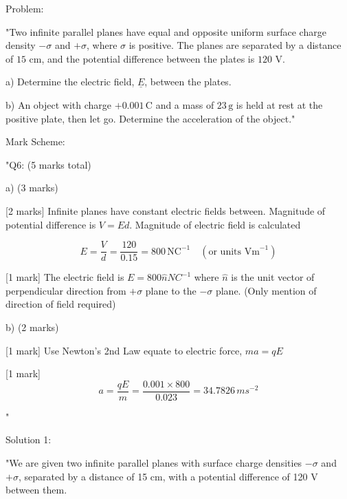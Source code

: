 Problem:

"Two infinite parallel planes have equal and opposite uniform surface charge density \( -\sigma \) and \( +\sigma \), where \( \sigma \) is positive. The planes are separated by a distance of \( 15 \) cm, and the potential difference between the plates is \( 120 \) V. 

a) Determine the electric field, \( \underline{E} \), between the plates.

b) An object with charge \( +0.001 \, \text{C} \) and a mass of \( 23 \, \text{g} \) is held at rest at the positive plate, then let go. Determine the acceleration of the object."

Mark Scheme:

"{Q6: (5 marks total)}

a) (3 marks)

[2 marks] Infinite planes have constant electric fields between. Magnitude of potential difference is \( V = Ed \). Magnitude of electric field is calculated 

\[ E = \frac{V}{d} = \frac{120}{0.15} = 800 \, \text{NC}^{-1} \quad (\text{or units } \mathrm{Vm}^{-1}) \]

[1 mark] The electric field is \(E = 800 \hat{n} NC^{-1} \) where \( \hat{n} \) is the unit vector of perpendicular direction from \( +\sigma \) plane to the \( -\sigma \) plane. (Only mention of direction of field required)

b) (2 marks)

[1 mark] Use Newton’s 2nd Law equate to electric force, \( ma = qE \)

[1 mark] \[ a = \frac{qE}{m} = \frac{0.001 \times 800}{0.023} = 34.7826 \, ms^{-2} \]

"

Solution 1: 

"We are given two infinite parallel planes with surface charge densities $-\sigma$ and $+\sigma$, separated by a distance of 15 cm, with a potential difference of 120 V between them. 

